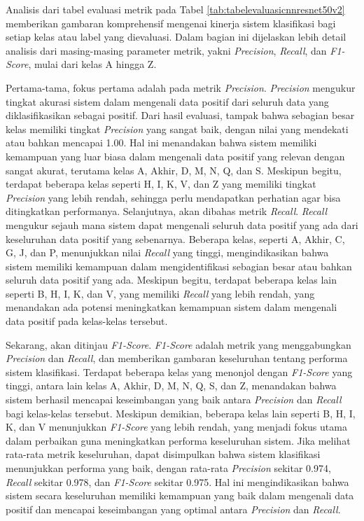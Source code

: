 Analisis dari tabel evaluasi metrik pada Tabel \ref{tab:tabelevaluasicnnresnet50v2} memberikan gambaran komprehensif mengenai kinerja sistem klasifikasi bagi setiap kelas atau label yang dievaluasi. Dalam bagian ini dijelaskan lebih detail analisis dari masing-masing parameter metrik, yakni \textit{Precision}, \textit{Recall}, dan \textit{F1-Score}, mulai dari kelas A hingga Z.

Pertama-tama, fokus pertama adalah pada metrik \textit{Precision}. \textit{Precision} mengukur tingkat akurasi sistem dalam mengenali data positif dari seluruh data yang diklasifikasikan sebagai positif. Dari hasil evaluasi, tampak bahwa sebagian besar kelas memiliki tingkat \textit{Precision} yang sangat baik, dengan nilai yang mendekati atau bahkan mencapai 1.00. Hal ini menandakan bahwa sistem memiliki kemampuan yang luar biasa dalam mengenali data positif yang relevan dengan sangat akurat, terutama kelas A, Akhir, D, M, N, Q, dan S. Meskipun begitu, terdapat beberapa kelas seperti H, I, K, V, dan Z yang memiliki tingkat \textit{Precision} yang lebih rendah, sehingga perlu mendapatkan perhatian agar bisa ditingkatkan performanya. Selanjutnya, akan dibahas metrik \textit{Recall}. \textit{Recall} mengukur sejauh mana sistem dapat mengenali seluruh data positif yang ada dari keseluruhan data positif yang sebenarnya. Beberapa kelas, seperti A, Akhir, C, G, J, dan P, menunjukkan nilai \textit{Recall} yang tinggi, mengindikasikan bahwa sistem memiliki kemampuan dalam mengidentifikasi sebagian besar atau bahkan seluruh data positif yang ada. Meskipun begitu, terdapat beberapa kelas lain seperti B, H, I, K, dan V, yang memiliki \textit{Recall} yang lebih rendah, yang menandakan ada potensi  meningkatkan kemampuan sistem dalam mengenali data positif pada kelas-kelas tersebut.

Sekarang, akan ditinjau \textit{F1-Score}. \textit{F1-Score} adalah metrik yang menggabungkan \textit{Precision} dan \textit{Recall}, dan memberikan gambaran keseluruhan tentang performa sistem klasifikasi. Terdapat beberapa kelas yang menonjol dengan \textit{F1-Score} yang tinggi, antara lain kelas A, Akhir, D, M, N, Q, S, dan Z, menandakan bahwa sistem berhasil mencapai keseimbangan yang baik antara \textit{Precision} dan \textit{Recall} bagi kelas-kelas tersebut. Meskipun demikian, beberapa kelas lain seperti B, H, I, K, dan V menunjukkan \textit{F1-Score} yang lebih rendah, yang menjadi fokus utama dalam perbaikan guna meningkatkan performa keseluruhan sistem. Jika melihat rata-rata metrik keseluruhan, dapat disimpulkan bahwa sistem klasifikasi menunjukkan performa yang baik, dengan rata-rata \textit{Precision} sekitar 0.974, \textit{Recall} sekitar 0.978, dan \textit{F1-Score} sekitar 0.975. Hal ini mengindikasikan bahwa sistem secara keseluruhan memiliki kemampuan yang baik dalam mengenali data positif dan mencapai keseimbangan yang optimal antara \textit{Precision} dan \textit{Recall}.

